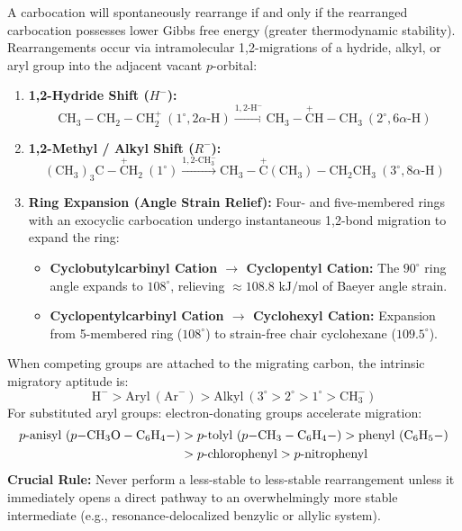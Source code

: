 \documentclass[10pt,twoside,openright]{book}
\begin{document}
\begin{formulabox}
A carbocation will spontaneously rearrange if and only if the rearranged carbocation possesses lower Gibbs free energy (greater thermodynamic stability). Rearrangements occur via intramolecular 1,2-migrations of a hydride, alkyl, or aryl group into the adjacent vacant $p$-orbital:
\begin{enumerate}[leftmargin=*]
  \item \textbf{1,2-Hydride Shift ($H^-$):}
  \begin{equation}
    \mathrm{CH_3-CH_2-CH_2^+} \ (1^\circ, 2\alpha\text{-H}) \xrightarrow{1,2\text{-H}^-} \mathrm{CH_3-\overset{+}{C}H-CH_3} \ (2^\circ, 6\alpha\text{-H})
  \end{equation}
  \item \textbf{1,2-Methyl / Alkyl Shift ($R^-$):}
  \begin{equation}
    \mathrm{(CH_3)_3C-\overset{+}{C}H_2} \ (1^\circ) \xrightarrow{1,2\text{-CH}_3^-} \mathrm{CH_3-\overset{+}{C}(CH_3)-CH_2CH_3} \ (3^\circ, 8\alpha\text{-H})
  \end{equation}
  \item \textbf{Ring Expansion (Angle Strain Relief):}
  Four- and five-membered rings with an exocyclic carbocation undergo instantaneous 1,2-bond migration to expand the ring:
  \begin{itemize}
    \item \textbf{Cyclobutylcarbinyl Cation $\to$ Cyclopentyl Cation:} The $90^\circ$ ring angle expands to $108^\circ$, relieving $\approx 108.8\text{ kJ/mol}$ of Baeyer angle strain.
    \item \textbf{Cyclopentylcarbinyl Cation $\to$ Cyclohexyl Cation:} Expansion from 5-membered ring ($108^\circ$) to strain-free chair cyclohexane ($109.5^\circ$).
  \end{itemize}
\end{enumerate}
\end{formulabox}

\begin{trapbox}
When competing groups are attached to the migrating carbon, the intrinsic migratory aptitude is:
\begin{equation}
  \mathrm{H}^- > \mathrm{Aryl} \ (\mathrm{Ar}^-) > \mathrm{Alkyl} \ (3^\circ > 2^\circ > 1^\circ > \mathrm{CH_3^-})
\end{equation}
For substituted aryl groups: electron-donating groups accelerate migration:
\begin{align}
  p\text{-anisyl } (p\mathrm{-CH_3O-C_6H_4-}) &> p\text{-tolyl } (p\mathrm{-CH_3-C_6H_4-}) > \text{phenyl } (\mathrm{C_6H_5-}) \notag \\
  &> p\text{-chlorophenyl} > p\text{-nitrophenyl}
\end{align}
\textbf{Crucial Rule:} Never perform a less-stable to less-stable rearrangement unless it immediately opens a direct pathway to an overwhelmingly more stable intermediate (e.g., resonance-delocalized benzylic or allylic system).
\end{trapbox}
\end{document}
